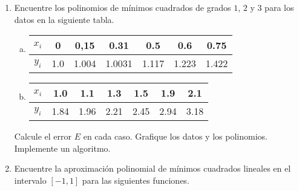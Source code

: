 \documentclass[
  spanish,
  8pt,
  utf8,
  xcolor=table,
  handout,
  aspectratio=169,
  professionalfonts,
  notheorems,
  mathserif,
]{beamer}
\begin{document}
\begin{frame}
	\begin{enumerate}
		\item

		      Encuentre los polinomios de mínimos cuadrados de grados
		      $1$, $2$ y $3$ para los datos en la siguiente tabla.

		      \begin{multicols}{2}
			      \begin{enumerate}[a)]

				      \item

				            \begin{table}[ht!]
					            \centering
					            \begin{tabular}{ccccccc}
						            $x_{i}$ & 0   & 0,15  & 0.31   & 0.5   & 0.6   & 0.75  \\
						            \hline
						            $y_{i}$ & 1.0 & 1.004 & 1.0031 & 1.117 & 1.223 & 1.422
					            \end{tabular}
				            \end{table}

				      \item

				            \begin{table}[ht!]
					            \centering
					            \begin{tabular}{ccccccc}
						            $x_{i}$ & 1.0  & 1.1  & 1.3  & 1.5  & 1.9  & 2.1  \\
						            \hline
						            $y_{i}$ & 1.84 & 1.96 & 2.21 & 2.45 & 2.94 & 3.18
					            \end{tabular}
				            \end{table}
			      \end{enumerate}
		      \end{multicols}
		      Calcule el error $E$ en cada caso.
		      Grafique los datos y los polinomios.
		      Implemente un algoritmo.

		\item

		      Encuentre la aproximación polinomial de mínimos cuadrados
		      lineales en el intervalo $\left[-1,1\right]$ para las
		      siguientes funciones.

		      \begin{multicols}{2}

			      \begin{enumerate}[a)]


\end{enumerate}
\end{multicols}
\end{enumerate}
\end{frame}
\end{document}
